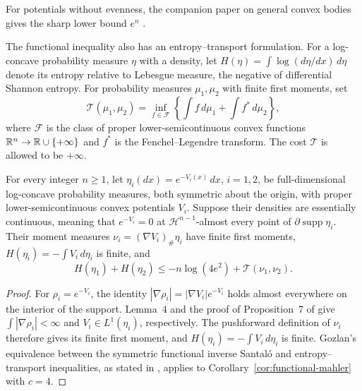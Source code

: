 For potentials without evenness, the companion paper on general convex
bodies gives the sharp lower bound $e^n$
\cite[Corollary~1.2]{OpenAIGeneralMahler2026}.

The functional inequality also has an entropy--transport formulation.
For a log-concave probability measure $\eta$ with a density, let
$H(\eta)=\int\log(d\eta/dx)\,d\eta$ denote its entropy relative to
Lebesgue measure, the negative of differential Shannon entropy.
For probability measures $\mu_1,\mu_2$ with finite first moments, set
\[
 \mathcal T(\mu_1,\mu_2)=
 \inf_{f\in\mathcal F}\left\{\int f\,d\mu_1+\int f^*\,d\mu_2\right\},
\]
where $\mathcal F$ is the class of proper lower-semicontinuous convex
functions $\mathbb R^n\to\mathbb R\cup\{+\infty\}$ and $f^*$ is the Fenchel--Legendre
transform. The cost $\mathcal T$ is allowed to be $+\infty$.

\begin{corollary}\label{cor:entropy-transport}
For every integer $n\ge1$, let $\eta_i(dx)=e^{-V_i(x)}\,dx$, $i=1,2$,
be full-dimensional log-concave probability measures, both symmetric
about the origin, with proper lower-semicontinuous convex potentials
$V_i$. Suppose their densities are essentially continuous, meaning that
$e^{-V_i}=0$ at $\mathcal H^{n-1}$-almost every point of
$\partial\operatorname{supp}\eta_i$. Their moment measures
$\nu_i=(\nabla V_i)_\#\eta_i$ have finite first moments,
$H(\eta_i)=-\int V_i\,d\eta_i$ is finite, and
\[
 H(\eta_1)+H(\eta_2)\le -n\log(4e^2)+\mathcal T(\nu_1,\nu_2).
\]
\end{corollary}

\begin{proof}
For $\rho_i=e^{-V_i}$, the identity
$|\nabla\rho_i|=|\nabla V_i|e^{-V_i}$ holds almost everywhere on the
interior of the support. Lemma~4 and the proof of Proposition~7 of
\cite{CorderoErausquinKlartag2015} give
$\int |\nabla\rho_i|<\infty$ and $V_i\in L^1(\eta_i)$, respectively.
The pushforward definition of $\nu_i$ therefore gives its finite first
moment, and $H(\eta_i)=-\int V_i\,d\eta_i$ is finite.
Gozlan's equivalence between the symmetric functional inverse Santal\'o
and entropy--transport inequalities, as stated in
\cite[Theorem~1.3]{FradeliziGozlanZugmeyer2021}, applies to
Corollary~\ref{cor:functional-mahler} with $c=4$.
\end{proof}
